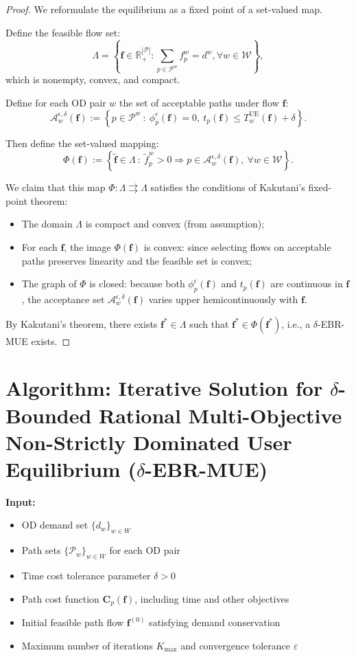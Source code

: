 \documentclass[11pt]{article}
\begin{document}
\begin{proof}
We reformulate the equilibrium as a fixed point of a set-valued map.

Define the feasible flow set:
\[
\Lambda = \left\{ \mathbf{f} \in \mathbb{R}_+^{|\mathcal{P}|} : \sum_{p \in \mathcal{P}^w} f_p^w = d^w, \forall w \in \mathcal{W} \right\},
\]
which is nonempty, convex, and compact.

Define for each OD pair $w$ the set of acceptable paths under flow $\mathbf{f}$:
\[
\mathcal{A}_w^{\epsilon,\delta}(\mathbf{f}) := \left\{ p \in \mathcal{P}^w \ : \ \phi_p^\epsilon(\mathbf{f}) = 0,\ t_p(\mathbf{f}) \le T_w^{\mathrm{UE}}(\mathbf{f}) + \delta \right\}.
\]

Then define the set-valued mapping:
\[
\Phi(\mathbf{f}) := \left\{ \tilde{\mathbf{f}} \in \Lambda \ : \ \tilde{f}_p^w > 0 \Rightarrow p \in \mathcal{A}_w^{\epsilon,\delta}(\mathbf{f}), \ \forall w \in \mathcal{W} \right\}.
\]

We claim that this map $\Phi : \Lambda \rightrightarrows \Lambda$ satisfies the conditions of Kakutani’s fixed-point theorem:

\begin{itemize}
    \item The domain $\Lambda$ is compact and convex (from assumption);
    \item For each $\mathbf{f}$, the image $\Phi(\mathbf{f})$ is convex: since selecting flows on acceptable paths preserves linearity and the feasible set is convex;
    \item The graph of $\Phi$ is closed: because both $\phi_p^\epsilon(\mathbf{f})$ and $t_p(\mathbf{f})$ are continuous in $\mathbf{f}$, the acceptance set $\mathcal{A}_w^{\epsilon,\delta}(\mathbf{f})$ varies upper hemicontinuously with $\mathbf{f}$.
\end{itemize}

By Kakutani’s theorem, there exists $ \mathbf{f}^* \in \Lambda$ such that $ \mathbf{f}^* \in \Phi(\mathbf{f}^*) $, i.e., a $\delta$-EBR-MUE exists.
\end{proof}

\section*{Algorithm: Iterative Solution for $\delta$-Bounded Rational Multi-Objective Non-Strictly Dominated User Equilibrium ($\delta$-EBR-MUE)}

\textbf{Input:}
\begin{itemize}
    \item OD demand set \(\{ d_w \}_{w \in W}\)
    \item Path sets \(\{ \mathcal{P}_w \}_{w \in W}\) for each OD pair
    \item Time cost tolerance parameter \(\delta > 0\)
    \item Path cost function \(\mathbf{C}_p(\mathbf{f})\), including time and other objectives
    \item Initial feasible path flow \(\mathbf{f}^{(0)}\) satisfying demand conservation
    \item Maximum number of iterations \(K_{\max}\) and convergence tolerance \(\varepsilon\)
\end{itemize}
\end{document}
